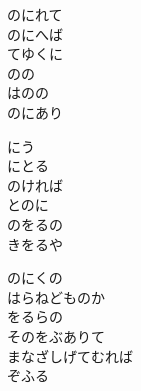 \documentclass[10pt,b5j]{tarticle} %
\begin{document}
\vspace{1.5em} %
\newcommand{\linespace}{0.5em} %
\newcommand{\blocksize}{0.5\hsize} %
\begin{enumerate} %
    \begin{minipage}[c]{\blocksize}
    
        \vspace{\linespace}
        \item
        のにれて\\
        のにへば\\
        てゆくに\\
        のの\\
        はのの\\
        のにあり
        
        \vspace{\linespace}
        \item
        にう\\
        にとる\\
        のければ\\
        とのに\\
        のをるの\\
        きをるや
        
        \vspace{\linespace}
        \item
        のにくの\\
        はらねどものか\\
        をるらの\\
        そのをぶありて\\
        まなざしげてむれば\\
        ぞふる
    
    \end{minipage}
\end{enumerate} %
\end{document}
